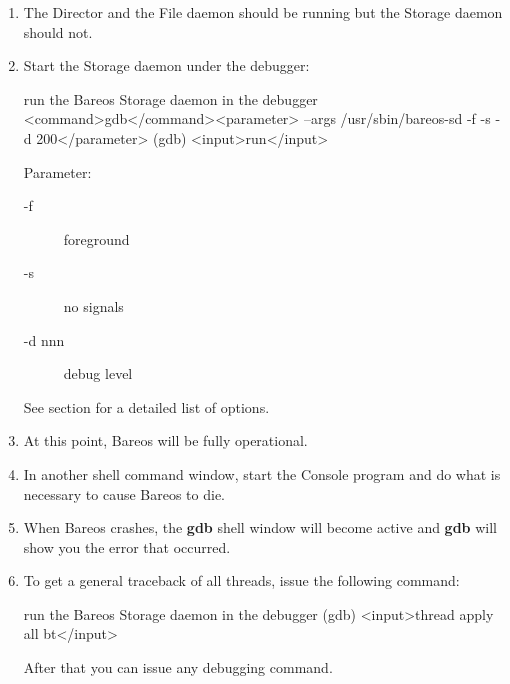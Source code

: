 \begin{enumerate}
\item The Director and the File daemon should  be running but
   the Storage daemon should not.

\item Start the Storage daemon under the debugger:

\begin{commands}{run the Bareos Storage daemon in the debugger}
<command>gdb</command><parameter> --args /usr/sbin/bareos-sd -f -s -d 200</parameter>
(gdb) <input>run</input>
\end{commands}

Parameter:
\begin{description}
 \item[-f] foreground
 \item[-s] no signals
 \item[-d nnn] debug level 
\end{description}
See section  for a detailed list of options.

\item At this point, Bareos will be fully operational.

\item In another shell command window, start the Console program  and do what
   is necessary to cause Bareos to die.

\item When Bareos crashes, the {\bf gdb} shell window will  become active and
   {\bf gdb} will show you the error that  occurred.

\item To get a general traceback of all threads, issue the following  command:

\begin{commands}{run the Bareos Storage daemon in the debugger}
(gdb) <input>thread apply all bt</input>
\end{commands}

After that you can issue any debugging command.
\end{enumerate}
